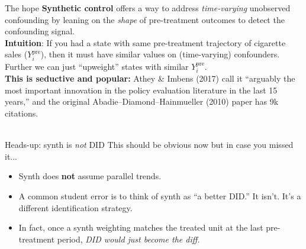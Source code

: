 \documentclass[handout,xcolor=dvipsnames,pdftex,hyperref={colorlinks=false}]{beamer}
\newcommand\makegaps{\addtolength{\itemsep}{.25\baselineskip}}
\newcommand{\ypre}{Y^{\text{pre}}_i}      %
\begin{document}
\begin{frame}{The hope}
  \small
\textbf{Synthetic control} offers a way to address \emph{time-varying} unobserved confounding by leaning on the \emph{shape} of pre-treatment outcomes to detect the confounding signal.\\[3ex]
\medskip
{} \textbf{Intuition}: If you had a state with same pre-treatment trajectory of cigarette sales ($\ypre$), then it must have similar values on (time-varying) confounders.  Further we can just ``upweight'' states with similar $\ypre$. \\

\bigskip
{}  \textbf{This is seductive and popular:} Athey \& Imbens (2017) call it ``arguably the most important innovation in the policy evaluation literature in the last 15 years,'' and the original Abadie--Diamond--Hainmueller (2010) paper has 9k citations.\\

\bigskip
{} \\[1ex]

\end{frame}

\begin{frame}{Heads-up: synth is \emph{not} DID}
This should be obvious now but in case you missed it...\\
\begin{itemize}\makegaps
  \item<1-> Synth does \textbf{not} assume parallel trends.
  \item<2-> A common student error is to think of synth as ``a better DID.'' It isn't. It's a different identification strategy.
  \item<3-> In fact, once a synth weighting matches the treated unit at the last pre-treatment period, \emph{DID would just become the diff.}
\end{itemize}
\end{frame}
\end{document}
